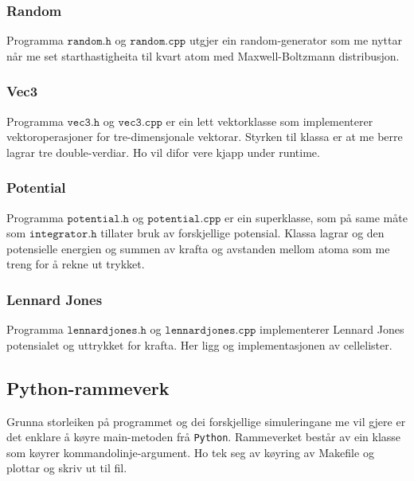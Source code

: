 \documentclass[12pt, a4paper]{article}
\theoremstyle{definition}
\begin{document}
        \subsubsection*{Random}
            Programma $\texttt{random.h}$ og $\texttt{random.cpp}$ utgjer ein random-generator som me nyttar når me set starthastigheita til kvart atom med 
            Maxwell-Boltzmann distribusjon.

        \subsubsection*{Vec3}
            Programma $\texttt{vec3.h}$ og $\texttt{vec3.cpp}$ er ein lett vektorklasse som implementerer vektoroperasjoner for tre-dimensjonale vektorar. Styrken til klassa 
            er at me berre lagrar tre double-verdiar. Ho vil difor vere kjapp under runtime.

        \subsubsection*{Potential}
            Programma $\texttt{potential.h}$ og $\texttt{potential.cpp}$ er ein superklasse, som på same måte som $\texttt{integrator.h}$ tillater bruk av forskjellige
            potensial. Klassa lagrar og den potensielle energien og summen av krafta og avstanden mellom atoma som me treng for å rekne ut trykket.

        \subsubsection*{Lennard Jones}
            Programma $\texttt{lennardjones.h}$ og $\texttt{lennardjones.cpp}$ implementerer Lennard Jones potensialet og uttrykket for krafta. Her ligg og implementasjonen 
            av cellelister.


    \subsection*{Python-rammeverk}
        Grunna storleiken på programmet og dei forskjellige simuleringane me vil gjere er det enklare å køyre main-metoden frå \verb!Python!. Rammeverket består av ein klasse
        som køyrer kommandolinje-argument. Ho tek seg av køyring av Makefile og plottar og skriv ut til fil.
\newpage
\end{document}
